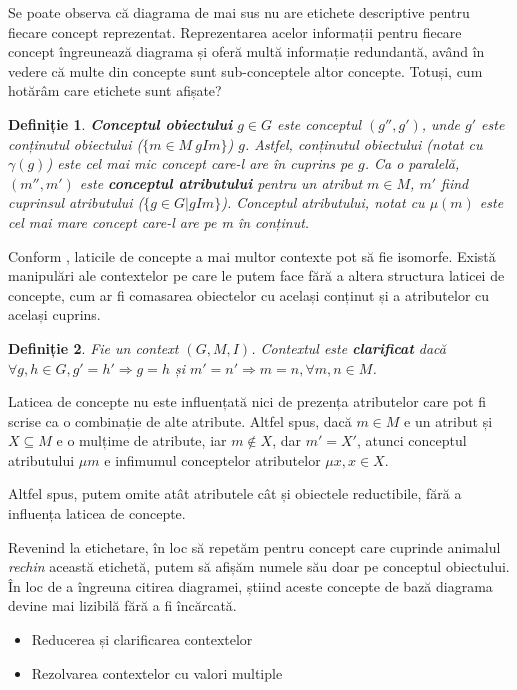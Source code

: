\documentclass[12pt, a4paper, twoside, romanian]{teza-upb}
\newtheorem{defn}{Definiție}
\begin{document}
    Se poate observa că diagrama de mai sus nu are etichete descriptive pentru fiecare concept reprezentat.
    Reprezentarea acelor informații pentru fiecare concept îngreunează diagrama și oferă multă informație redundantă, având în vedere că multe din concepte sunt sub-conceptele altor concepte. Totuși, cum hotărâm care etichete sunt afișate?



    \begin{defn}
      \textbf{Conceptul obiectului} $g \in G$ este conceptul $(g'', g')$, unde $g'$ este conținutul obiectului ($\{m \in M \ gIm\}$) $g$. Astfel, conținutul obiectului (notat cu $\gamma(g)$) este cel mai mic concept care-l are în cuprins pe $g$. Ca o paralelă, $(m'', m')$ este \textbf{conceptul atributului} pentru un atribut $m \in M$, $m'$ fiind cuprinsul atributului ($\{ g \in G|gIm\}$). Conceptul atributului, notat cu $\mu(m)$ este cel mai mare concept care-l are pe m în conținut.
    \end{defn}

    
    Conform \cite{Ganter:1997:FCA:550737}, laticile de concepte a mai multor contexte pot să fie isomorfe. Există manipulări ale contextelor pe care le putem face fără a altera structura laticei de concepte, cum ar fi comasarea obiectelor cu același conținut și a atributelor cu același cuprins. 

    \begin{defn}
      Fie un context $(G, M, I)$. Contextul este \textbf{clarificat} dacă $\forall g,h \in G, g' = h' \Rightarrow g = h$ și $m' = n' \Rightarrow m = n, \forall m,n \in M$.
    \end{defn}

    Laticea de concepte nu este influențată nici de prezența atributelor care pot fi scrise ca o combinație de alte atribute. Altfel spus, dacă $ m \in M$ e un atribut și $X \subseteq M$ e o mulțime de atribute, iar $m \notin X$, dar $m' = X'$, atunci conceptul atributului $\mu m$ e infimumul conceptelor atributelor $\mu x, x \in X$.

    Altfel spus, putem omite atât atributele cât și obiectele reductibile, fără a influența laticea de concepte.
  
    Revenind la etichetare, în loc să repetăm pentru concept care cuprinde animalul \textit{rechin} această etichetă, putem să afișăm numele său doar pe conceptul obiectului. În loc de a îngreuna citirea diagramei, știind aceste concepte de bază diagrama devine mai lizibilă fără a fi încărcată.
    \begin{itemize}
      \item Reducerea și clarificarea contextelor
      \item Rezolvarea contextelor cu valori multiple
    \end{itemize}
\end{document}
